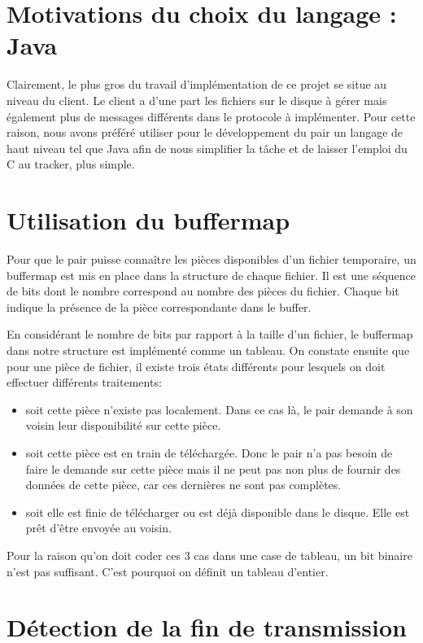 \section{Motivations du choix du langage : Java}

Clairement, le plus gros du travail d'implémentation de ce projet se situe au niveau du client.
Le client a d'une part les fichiers sur le disque à gérer mais également plus de messages différents dans le protocole à implémenter. Pour cette raison, nous avons préféré utiliser pour le développement du pair un langage de haut niveau tel que Java afin de nous simplifier la tâche et de laisser l'emploi du C au tracker, plus simple.

\section{Utilisation du buffermap}

Pour que le pair puisse connaître les pièces disponibles d'un fichier temporaire, un buffermap est mis en place 
dans la structure de chaque fichier. Il est une séquence de bits dont le nombre correspond au nombre des pièces 
du fichier. Chaque bit indique la présence de la pièce correspondante dans le buffer.

En considérant le nombre de bits par rapport à la taille d'un fichier, le buffermap dans notre structure est 
implémenté comme un tableau. On constate ensuite que pour une pièce de fichier, il existe trois états différents 
pour lesquels on doit effectuer différents traitements:
\begin{itemize}
\item soit cette pièce n'existe pas localement. Dans ce cas là, le pair demande à son voisin leur disponibilité 
sur cette pièce.
\item soit cette pièce est en train de téléchargée. Donc le pair n'a pas besoin de faire le demande sur cette 
pièce mais il ne peut pas non plus de fournir des données de cette pièce, car ces dernières ne sont pas complètes.
\item soit elle est finie de télécharger ou est déjà disponible dans le disque. Elle est prêt d'être envoyée au voisin.
\end{itemize}
Pour la raison qu'on doit coder ces 3 cas dans une case de tableau, un bit binaire n'est pas suffisant. 
C'est pourquoi on définit un tableau d'entier.

\section{Détection de la fin de transmission}

